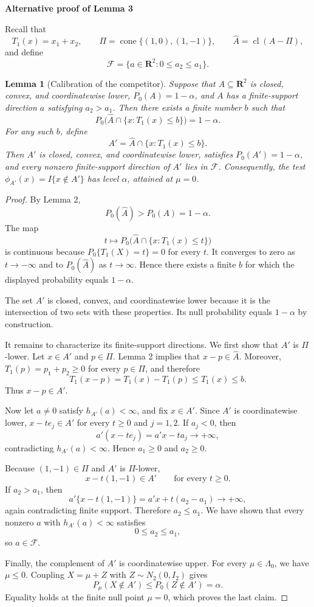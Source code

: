 \documentclass[10pt]{article}
\newtheorem{lemma}{Lemma}
\begin{document}
\begin{center}
    {\large\bfseries Alternative proof of Lemma 3}
\end{center}

\medskip

Recall that
\[
T_1(x)=x_1+x_2,
\qquad
\Pi=\operatorname{cone}\{(1,0),(1,-1)\},
\qquad
\widehat A=\operatorname{cl}(A-\Pi),
\]
and define
\[
\mathcal F=\{a\in\mathbf R^2:0\le a_2\le a_1\}.
\]

\setcounter{lemma}{2}
\begin{lemma}[Calibration of the competitor]
Suppose that $A\subseteq\mathbf R^2$ is closed, convex, and coordinatewise lower,
$P_0(A)=1-\alpha$, and $A$ has a finite-support direction $a$ satisfying
$a_2>a_1$. Then there exists a finite number $b$ such that
\[
P_0\bigl(\widehat A\cap\{x:T_1(x)\le b\}\bigr)=1-\alpha.
\]
For any such $b$, define
\[
A'=\widehat A\cap\{x:T_1(x)\le b\}.
\]
Then $A'$ is closed, convex, and coordinatewise lower, satisfies
$P_0(A')=1-\alpha$, and every nonzero finite-support direction of $A'$ lies in
$\mathcal F$. Consequently, the test $\phi_{A'}(x)=I\{x\notin A'\}$ has level
$\alpha$, attained at $\mu=0$.
\end{lemma}

\begin{proof}
By Lemma 2,
\[
P_0(\widehat A)>P_0(A)=1-\alpha.
\]
The map
\[
t\longmapsto P_0\bigl(\widehat A\cap\{x:T_1(x)\le t\}\bigr)
\]
is continuous because $P_0\{T_1(X)=t\}=0$ for every $t$. It converges to
zero as $t\to-\infty$ and to $P_0(\widehat A)$ as $t\to\infty$. Hence there
exists a finite $b$ for which the displayed probability equals $1-\alpha$.

The set $A'$ is closed, convex, and coordinatewise lower because it is the
intersection of two sets with these properties. Its null probability equals
$1-\alpha$ by construction.

It remains to characterize its finite-support directions. We first show that
$A'$ is $\Pi$-lower. Let $x\in A'$ and $p\in\Pi$. Lemma 2 implies that
$x-p\in\widehat A$. Moreover, $T_1(p)=p_1+p_2\ge0$ for every $p\in\Pi$, and
therefore
\[
T_1(x-p)=T_1(x)-T_1(p)\le T_1(x)\le b.
\]
Thus $x-p\in A'$.

Now let $a\ne0$ satisfy $h_{A'}(a)<\infty$, and fix $x\in A'$. Since $A'$ is
coordinatewise lower, $x-te_j\in A'$ for every $t\ge0$ and $j=1,2$. If
$a_j<0$, then
\[
a'(x-te_j)=a'x-ta_j\longrightarrow+\infty,
\]
contradicting $h_{A'}(a)<\infty$. Hence $a_1\ge0$ and $a_2\ge0$.

Because $(1,-1)\in\Pi$ and $A'$ is $\Pi$-lower,
\[
x-t(1,-1)\in A'
\qquad\text{for every }t\ge0.
\]
If $a_2>a_1$, then
\[
a'\{x-t(1,-1)\}=a'x+t(a_2-a_1)\longrightarrow+\infty,
\]
again contradicting finite support. Therefore $a_2\le a_1$. We have shown
that every nonzero $a$ with $h_{A'}(a)<\infty$ satisfies
\[
0\le a_2\le a_1,
\]
so $a\in\mathcal F$.

Finally, the complement of $A'$ is coordinatewise upper. For every
$\mu\in\Lambda_0$, we have $\mu\le0$. Coupling $X=\mu+Z$ with
$Z\sim N_2(0,I_2)$ gives
\[
P_\mu(X\notin A')\le P_0(Z\notin A')=\alpha.
\]
Equality holds at the finite null point $\mu=0$, which proves the last claim.
\end{proof}
\end{document}
